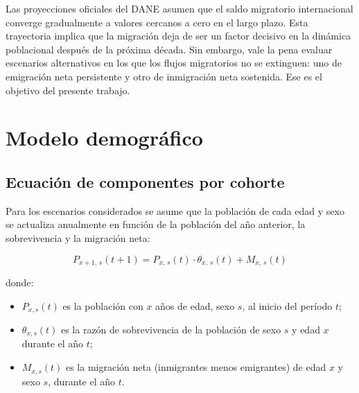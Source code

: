 \documentclass[12pt,a4paper]{article}
\begin{document}
Las proyecciones oficiales del DANE asumen que el saldo migratorio internacional converge gradualmente a valores cercanos a cero en el largo plazo. Esta trayectoria implica que la migración deja de ser un factor decisivo en la dinámica poblacional después de la próxima década. Sin embargo, vale la pena evaluar escenarios alternativos en los que los flujos migratorios no se extinguen: uno de emigración neta persistente y otro de inmigración neta sostenida. Ese es el objetivo del presente trabajo.

\section{Modelo demográfico}

\subsection{Ecuación de componentes por cohorte}

Para los escenarios considerados se asume que la población de cada edad y sexo se actualiza anualmente en función de la población del año anterior, la sobrevivencia y la migración neta:

\begin{equation}
\label{eq:cohorte}
P_{x+1,\, s}(t+1) = P_{x,\, s}(t) \cdot \theta_{x,\, s}(t) + M_{x,\, s}(t)
\end{equation}

\noindent donde:
\begin{itemize}[nosep]
    \item $P_{x,s}(t)$ es la población con $x$ años de edad, sexo $s$, al inicio del período $t$;
    \item $\theta_{x,s}(t)$ es la razón de sobrevivencia de la población de sexo $s$ y edad $x$ durante el año $t$;
    \item $M_{x,s}(t)$ es la migración neta (inmigrantes menos emigrantes) de edad $x$ y sexo $s$, durante el año $t$.
\end{itemize}
\end{document}
